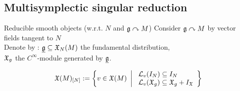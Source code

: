 \documentclass[handout,10pt]{beamer}
\makeatletter
\renewcommand{\action}{\curvearrowright}
\def\blfootnote{\gdef\@thefnmark{}\@footnotetext}
\makeatother
\begin{document}
    \subsection{Multisymplectic singular reduction}
      \begin{frame}{Reducible smooth objects \quad \small (w.r.t. $N$ and $\g\action M$)}
        Consider $\g \action M$ by vector fields tangent to $N$ %
        \\
        \vfill
        Denote by :
        \hspace{1em} $\underline{\mathfrak{g}}\subseteq \mathfrak{X}_N(M)$ the fundamental distribution,
        \\
        \hspace{6.5em}  $\mathfrak{X}_g$ the $C^\infty$-module generated by $\underline{\mathfrak{g}}$.
        \\
        \vfill
        \begin{defblock}
          \begin{displaymath}
            \mathfrak{X}(M)_{[N]} :=
            \left\lbrace
            v \in \mathfrak{X}(M)
            ~\left\vert~
            \begin{array}{l}
              \mathcal{L}_v (I_N) \subseteq I_N	\\
              \mathcal{L}_v (\mathfrak{X}_g) \subseteq \mathfrak{X}_g + I_{\mathfrak{X}}
            \end{array}
    \right\rbrace\right.
          \end{displaymath}
    

\end{defblock}
\end{frame}
\end{document}

